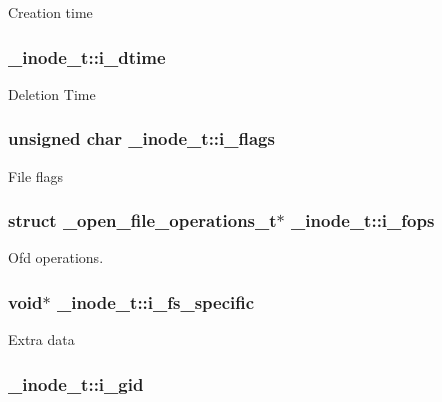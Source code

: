 Creation time \hypertarget{struct__inode__t_a393de4c58241168fdf397ab8421a3539}{
\subsubsection[{i\+\_\+dtime}]{ \+\_\+inode\+\_\+t\+::i\+\_\+dtime}}\label{struct__inode__t_a393de4c58241168fdf397ab8421a3539}
Deletion Time \hypertarget{struct__inode__t_a36ff48a57a9e483d74682972d31ef46c}{
\subsubsection[{i\+\_\+flags}]{\setlength{\rightskip}{0pt plus 5cm}unsigned char \+\_\+inode\+\_\+t\+::i\+\_\+flags}}\label{struct__inode__t_a36ff48a57a9e483d74682972d31ef46c}
File flags \hypertarget{struct__inode__t_acf149d7d1601f78142b1eec480badf7e}{
\subsubsection[{i\+\_\+fops}]{\setlength{\rightskip}{0pt plus 5cm}struct {\bf \+\_\+open\+\_\+file\+\_\+operations\+\_\+t}$\ast$ \+\_\+inode\+\_\+t\+::i\+\_\+fops}}\label{struct__inode__t_acf149d7d1601f78142b1eec480badf7e}
Ofd operations. \hypertarget{struct__inode__t_a54e34439c448c46bae90fd040dadc5c0}{
\subsubsection[{i\+\_\+fs\+\_\+specific}]{\setlength{\rightskip}{0pt plus 5cm}void$\ast$ \+\_\+inode\+\_\+t\+::i\+\_\+fs\+\_\+specific}}\label{struct__inode__t_a54e34439c448c46bae90fd040dadc5c0}
Extra data \hypertarget{struct__inode__t_a95d052a6e9b1b1e4f6837fa0f33b393e}{
\subsubsection[{i\+\_\+gid}]{ \+\_\+inode\+\_\+t\+::i\+\_\+gid}}\label{struct__inode__t_a95d052a6e9b1b1e4f6837fa0f33b393e}
